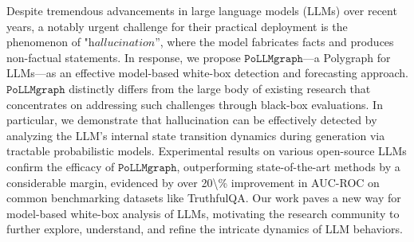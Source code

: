 Despite tremendous advancements in large language models (LLMs) over recent years,  a notably urgent challenge for their practical deployment is the phenomenon of  "$\textit{hallucination}$'', where the model fabricates facts and produces non-factual statements. In response, we propose $\texttt{PoLLMgraph}$—a Polygraph for LLMs—as an effective model-based white-box detection and forecasting approach. $\texttt{PoLLMgraph}$ distinctly differs from the large body of existing research that concentrates on addressing such challenges through black-box evaluations. In particular, we demonstrate that hallucination can be effectively detected by analyzing the LLM's internal state transition dynamics during generation via tractable probabilistic models. Experimental results on various open-source LLMs confirm the efficacy of $\texttt{PoLLMgraph}$, outperforming state-of-the-art methods by a considerable margin, evidenced by over 20\textbackslash{}\% improvement in AUC-ROC on common benchmarking datasets like TruthfulQA. Our work paves a new way for model-based white-box analysis of LLMs, motivating the research community to further explore, understand, and refine the intricate dynamics of LLM behaviors.
